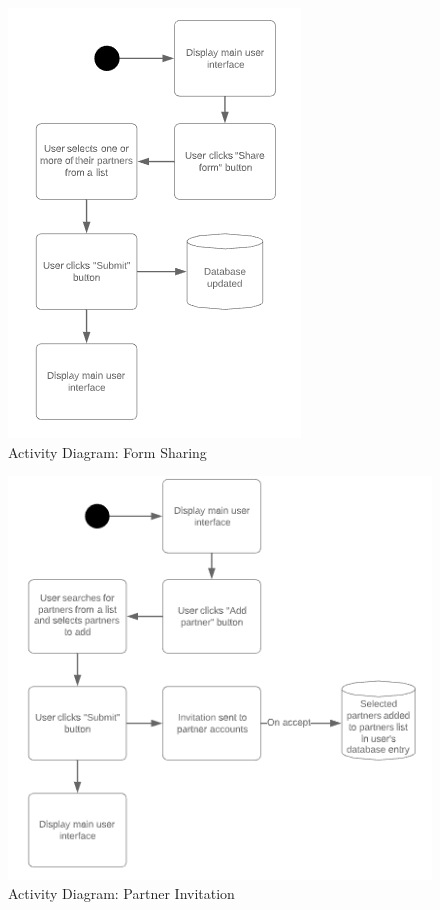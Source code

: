 \begin{figure}[]
\center
\includegraphics{../figures/ActivityDiagramFormSharing}
\caption{Activity Diagram: Form Sharing}
\end{figure}

\begin{figure}[]
\center
\includegraphics{../figures/ActivityDiagramPartnerInvitation}
\caption{Activity Diagram: Partner Invitation}
\end{figure}
